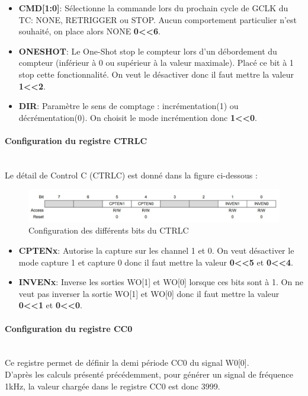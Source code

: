 \documentclass[a4paper]{article}
\begin{document}
	\begin{itemize}
		\item {\bf CMD[1:0]}: Sélectionne la commande lors du prochain cycle de GCLK du TC: NONE, RETRIGGER ou STOP. Aucun comportement particulier n’est souhaité, on place alors NONE {\bf 0\textless\textless6}.~~\\
		\item {\bf ONESHOT}: Le One-Shot stop le compteur lors d’un débordement du compteur (inférieur à 0 ou supérieur à la valeur maximale). Placé ce bit à 1 stop cette fonctionnalité. On veut le désactiver donc il faut mettre la valeur {\bf 1\textless\textless2}.~~\\
		\item {\bf DIR}: Paramètre le sens de comptage : incrémentation(1) ou décrémentation(0). On choisit le mode incrémention donc {\bf 1\textless\textless0}.~~\\
	\end{itemize}
	
	\paragraph{Configuration du registre CTRLC} 
	~~\\
	Le détail de Control C (CTRLC) est donné dans la figure ci-dessous :
	\begin{figure}[H]
		\centering
		\includegraphics[width=0.9\linewidth]{CTRLC.jpg}
		\caption{Configuration des différents bits du CTRLC}
	\end{figure}
	
	\begin{itemize}
		\item {\bf CPTENx}: Autorise la capture sur les channel 1 et 0. On veut désactiver le mode capture 1 et capture 0 donc il faut mettre la valeur {\bf 0\textless\textless5} et {\bf 0\textless\textless4}.~~\\
		\item {\bf INVENx}: Inverse les sorties WO[1] et WO[0] lorsque ces bits sont à 1. On ne veut pas inverser la sortie WO[1] et WO[0] donc il faut mettre la valeur {\bf 0\textless\textless1} et {\bf 0\textless\textless0}.~~\\
	\end{itemize}
	
	\paragraph{Configuration du registre CC0} 
	~~\\
	Ce registre permet de définir la demi période CC0 du signal W0[0]. \\
	D’après les calculs présenté précédemment, pour générer un signal de fréquence 1kHz, la valeur chargée dans le registre CC0 est donc 3999.\\
	
\end{document}

